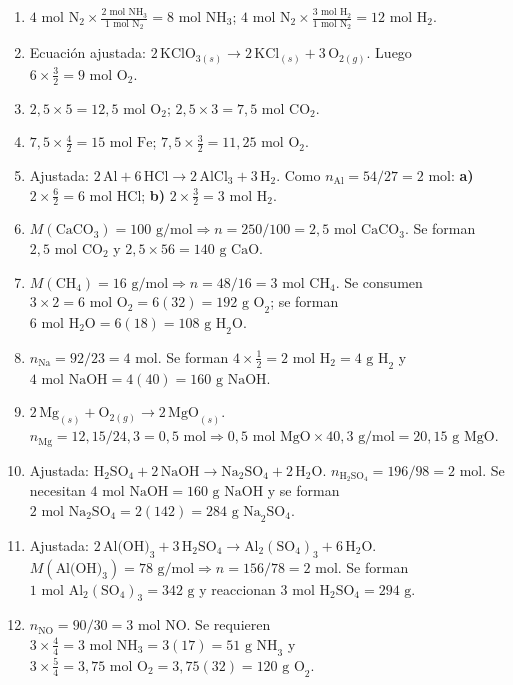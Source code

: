 \documentclass[12pt, letterpaper]{article}
\begin{document}
\begin{enumerate}[leftmargin=*, label=\textbf{\arabic*.}, start=13]
  \item $4\text{ mol N}_2 \times \frac{2\text{ mol NH}_3}{1\text{ mol N}_2} = 8\text{ mol NH}_3$; \quad $4\text{ mol N}_2 \times \frac{3\text{ mol H}_2}{1\text{ mol N}_2} = 12\text{ mol H}_2$.
  \item Ecuación ajustada: $2\,\text{KClO}_{3(s)} \longrightarrow 2\,\text{KCl}_{(s)} + 3\,\text{O}_{2(g)}$. Luego $6 \times \frac{3}{2} = 9\text{ mol O}_2$.
  \item $2{,}5 \times 5 = 12{,}5\text{ mol O}_2$; \quad $2{,}5 \times 3 = 7{,}5\text{ mol CO}_2$.
  \item $7{,}5 \times \frac{4}{2} = 15\text{ mol Fe}$; \quad $7{,}5 \times \frac{3}{2} = 11{,}25\text{ mol O}_2$.
  \item Ajustada: $2\,\text{Al} + 6\,\text{HCl} \longrightarrow 2\,\text{AlCl}_3 + 3\,\text{H}_2$. Como $n_{\text{Al}} = 54/27 = 2\text{ mol}$: \textbf{a)} $2 \times \frac{6}{2} = 6\text{ mol HCl}$; \textbf{b)} $2 \times \frac{3}{2} = 3\text{ mol H}_2$.
  \item $M(\text{CaCO}_3) = 100\text{ g/mol} \Rightarrow n = 250/100 = 2{,}5\text{ mol CaCO}_3$. Se forman $2{,}5\text{ mol CO}_2$ y $2{,}5 \times 56 = 140\text{ g CaO}$.
  \item $M(\text{CH}_4) = 16\text{ g/mol} \Rightarrow n = 48/16 = 3\text{ mol CH}_4$. Se consumen $3\times 2 = 6\text{ mol O}_2 = 6(32) = 192\text{ g O}_2$; se forman $6\text{ mol H}_2\text{O} = 6(18) = 108\text{ g H}_2\text{O}$.
  \item $n_{\text{Na}} = 92/23 = 4\text{ mol}$. Se forman $4\times\frac{1}{2} = 2\text{ mol H}_2 = 4\text{ g H}_2$ y $4\text{ mol NaOH} = 4(40) = 160\text{ g NaOH}$.
  \item $2\,\text{Mg}_{(s)} + \text{O}_{2(g)} \longrightarrow 2\,\text{MgO}_{(s)}$. $n_{\text{Mg}} = 12{,}15/24{,}3 = 0{,}5\text{ mol} \Rightarrow 0{,}5\text{ mol MgO} \times 40{,}3\text{ g/mol} = 20{,}15\text{ g MgO}$.
  \item Ajustada: $\text{H}_2\text{SO}_4 + 2\,\text{NaOH} \longrightarrow \text{Na}_2\text{SO}_4 + 2\,\text{H}_2\text{O}$. $n_{\text{H}_2\text{SO}_4} = 196/98 = 2\text{ mol}$. Se necesitan $4\text{ mol NaOH} = 160\text{ g NaOH}$ y se forman $2\text{ mol Na}_2\text{SO}_4 = 2(142) = 284\text{ g Na}_2\text{SO}_4$.
  \item Ajustada: $2\,\text{Al(OH)}_3 + 3\,\text{H}_2\text{SO}_4 \longrightarrow \text{Al}_2(\text{SO}_4)_3 + 6\,\text{H}_2\text{O}$. $M(\text{Al(OH)}_3) = 78\text{ g/mol} \Rightarrow n = 156/78 = 2\text{ mol}$. Se forman $1\text{ mol Al}_2(\text{SO}_4)_3 = 342\text{ g}$ y reaccionan $3\text{ mol H}_2\text{SO}_4 = 294\text{ g}$.
  \item $n_{\text{NO}} = 90/30 = 3\text{ mol NO}$. Se requieren $3\times\frac{4}{4} = 3\text{ mol NH}_3 = 3(17) = 51\text{ g NH}_3$ y $3\times\frac{5}{4} = 3{,}75\text{ mol O}_2 = 3{,}75(32) = 120\text{ g O}_2$.
\end{enumerate}
\end{document}
